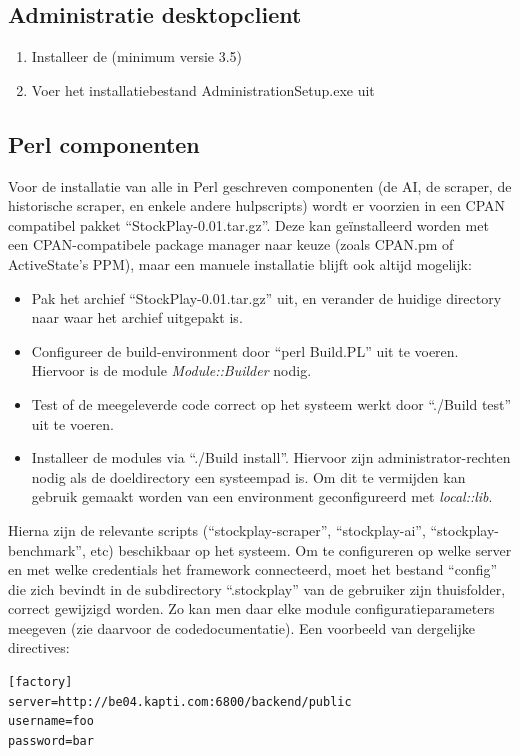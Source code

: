 \subsection{Administratie desktopclient}

\begin{enumerate}
\item Installeer de  (minimum versie 3.5)
\item{Voer het installatiebestand AdministrationSetup.exe uit}
\end{enumerate}

\subsection{Perl componenten}

Voor de installatie van alle in Perl geschreven componenten (de AI, de scraper, de historische scraper, en enkele andere hulpscripts) wordt er voorzien in een CPAN compatibel pakket ``StockPlay-0.01.tar.gz''. Deze kan ge\"installeerd worden met een CPAN-compatibele package manager naar keuze (zoals CPAN.pm of ActiveState's PPM), maar een manuele installatie blijft ook altijd mogelijk:
\begin{itemize}
\item Pak het archief ``StockPlay-0.01.tar.gz'' uit, en verander de huidige directory naar waar het archief uitgepakt is.
\item Configureer de build-environment door ``perl Build.PL'' uit te voeren. Hiervoor is de module \emph{Module::Builder} nodig.
\item Test of de meegeleverde code correct op het systeem werkt door ``./Build test'' uit te voeren.
\item Installeer de modules via ``./Build install''. Hiervoor zijn administrator-rechten nodig als de doeldirectory een systeempad is. Om dit te vermijden kan gebruik gemaakt worden van een environment geconfigureerd met \emph{local::lib}.
\end{itemize}

Hierna zijn de relevante scripts (``stockplay-scraper'', ``stockplay-ai'', ``stockplay-benchmark'', etc) beschikbaar op het systeem. Om te configureren op welke server en met welke credentials het framework connecteerd, moet het bestand ``config'' die zich bevindt in de subdirectory ``.stockplay'' van de gebruiker zijn thuisfolder, correct gewijzigd worden. Zo kan men daar elke module configuratieparameters meegeven (zie daarvoor de codedocumentatie). Een voorbeeld van dergelijke directives:
\begin{verbatim}
[factory]
server=http://be04.kapti.com:6800/backend/public
username=foo
password=bar
\end{verbatim}

